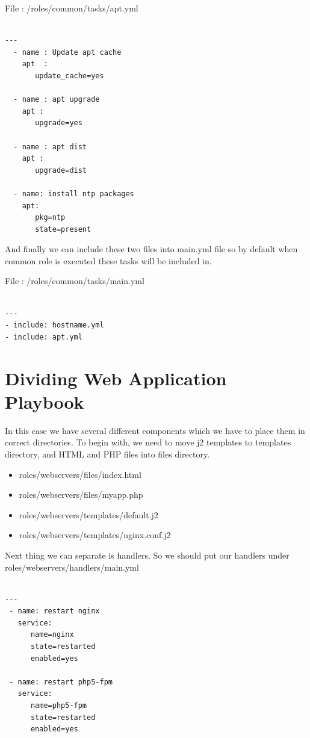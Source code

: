 \documentclass[10pt]{book}
\begin{document}
File : /roles/common/tasks/apt.yml
\begin{Verbatim} 
 
---
  - name : Update apt cache
    apt  : 
       update_cache=yes

  - name : apt upgrade
    apt : 
       upgrade=yes

  - name : apt dist
    apt : 
       upgrade=dist

  - name: install ntp packages
    apt:
       pkg=ntp 
       state=present

\end{Verbatim}  

And finally we can include these two files into main.yml file so by default when 
common role is executed these tasks will be included in.

File : /roles/common/tasks/main.yml
\begin{Verbatim} 
 
---
- include: hostname.yml
- include: apt.yml

\end{Verbatim}  


\section{Dividing Web Application Playbook}
In this case we have several different components which we have to place them in 
correct directories. To begin with, we need to move j2 templates to templates 
directory, and HTML and PHP files into files directory.

\begin{itemize}
\item roles/webservers/files/index.html
\item roles/webservers/files/myapp.php
\item roles/webservers/templates/default.j2
\item roles/webservers/templates/nginx.conf.j2
\end{itemize}

Next thing we can separate is handlers. So we should put our handlers under roles/webservers/handlers/main.yml


\begin{Verbatim} 
 
---
 - name: restart nginx
   service: 
      name=nginx
      state=restarted
      enabled=yes

 - name: restart php5-fpm 
   service: 
      name=php5-fpm 
      state=restarted
      enabled=yes
      
\end{Verbatim}  
\end{document}
